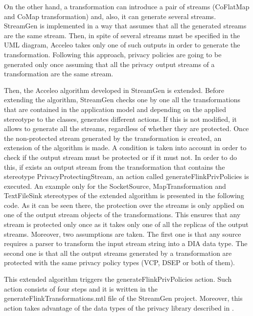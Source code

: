 On the other hand, a transformation can introduce a pair of streams (CoFlatMap and CoMap transformation) and, also, it can generate several streams. StreamGen is implemented in a way that assumes that all the generated streams are the same stream. Then, in spite of several streams must be specified in the UML diagram, Acceleo takes only one of such outputs in order to generate the transformation. Following this approach, privacy policies are going to be generated only once assuming that all the privacy output streams of a transformation are the same stream.

Then, the Acceleo algorithm developed in StreamGen is extended. Before extending the algorithm, StreamGen checks one by one all the transformations that are contained in the application model and depending on the applied stereotype to the classes, generates different actions. If this is not modified, it allows to generate all the streams, regardless of whether they are protected. Once the non-protected stream generated by the transformation is created, an extension of the algorithm is made. A condition is taken into account in order to check if the output stream must be protected or if it must not. In order to do this, if exists an output stream from the transformation that contains the stereotype PrivacyProtectingStream, an action called generateFlinkPrivPolicies is executed. An example only for the SocketSource, MapTransformation and TextFileSink stereotypes of the extended algorithm is presented in the following code. As it can be seen there, the protection over the streams is only applied on one of the output stream objects of the transformations. This ensures that any stream is protected only once as it takes only one of all the replicas of the output streams. Moreover, two assumptions are taken. The first one is that any source requires a parser to transform the input stream string into a DIA data type. The second one is that all the output streams generated by a transformation are protected with the same privacy policy types (VCP, DSEP or both of them).



This extended algorithm triggers the generateFlinkPrivPolicies action. Such action consists of four steps and it is written in the generateFlinkTransformations.mtl file of the StreamGen project. Moreover, this action takes advantage of the data types of the privacy library described in \cite{privacypoliciesarticle}.

